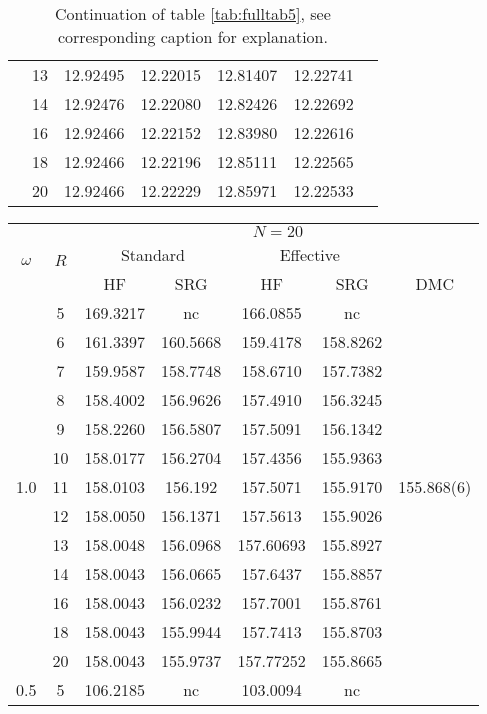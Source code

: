 \begin{table}
\begin{center}
\begin{tabular}{|c|c|c|c|c|c|c|}
& 13&12.92495 &12.22015 &12.81407 &12.22741 & \\
&14 &12.92476 &12.22080 &12.82426 &12.22692 & \\
&16 &12.92466 &12.22152 &12.83980 &12.22616 & \\
& 18&12.92466 &12.22196 & 12.85111&  12.22565& \\
& 20 &12.92466&12.22229 &12.85971 &12.22533 & \\
\hline
\end{tabular}
\end{center}
\caption{Continuation of table \ref{tab:fulltab5}, see corresponding caption for explanation.}
\label{tab:fulltab5_2}
\end{table}


\begin{table}
\begin{center}
\tabcolsep=0.35cm
\begin{tabular}{|c|c|c|c|c|c|c|}
\hline
\multirow{3}{*}{$\omega$} & \multirow{3}{*}{$R$} & \multicolumn{5}{|c|}{$N=20$} \\
& & \multicolumn{2}{|c|}{Standard} & \multicolumn{2}{|c|}{Effective} &  \\
& & HF & SRG & HF & SRG & DMC \\
\hline\hline
\multirow{13}{*}{1.0} & 5&169.3217 & nc&166.0855 &nc & \multirow{13}{*}{155.868(6)} \\
& 6& 161.3397&160.5668 & 159.4178 &158.8262 & \\
& 7&159.9587 &158.7748 &158.6710 &157.7382 & \\
& 8&158.4002 &156.9626 &157.4910 &156.3245 & \\
& 9&158.2260 &156.5807 &157.5091 &156.1342 & \\
& 10&158.0177 &156.2704 &157.4356 &155.9363 & \\
& 11&158.0103 &156.192 &157.5071 &155.9170 & \\
& 12&158.0050 &156.1371 &157.5613 &155.9026 & \\
& 13 &158.0048 & 156.0968 &157.60693 &155.8927 & \\
&14 &158.0043 &156.0665 &157.6437 &155.8857 & \\
&16 &158.0043 &156.0232 &157.7001 &155.8761 & \\
& 18&158.0043 &155.9944 & 157.7413&155.8703 & \\ 
& 20&158.0043 &155.9737 &157.77252 &155.8665 & \\
\hline
\multirow{13}{*}{0.5} & 5&106.2185 &nc &103.0094 &nc & \multirow{13}{*}{} \\

\end{tabular}
\end{center}
\end{table}
